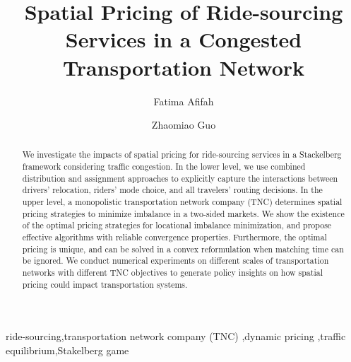 \documentclass[review]{elsarticle}
\begin{document}
\begin{frontmatter}

\title{Spatial Pricing of Ride-sourcing Services in a Congested Transportation Network}



\author[mymainaddress]{Fatima Afifah}
\author[mymainaddress]{Zhaomiao Guo}

\address[mymainaddress]{Department of Civil, Environmental and Construction Engineering\\
Resilient, Intelligent and Sustainable Energy Systems Cluster\\ 
	University of Central Florida, FL 32766
}

\begin{abstract}
	 We investigate the impacts of spatial pricing for ride-sourcing services in a Stackelberg framework considering traffic congestion. In the lower level, we use combined distribution and assignment approaches to explicitly capture the interactions between drivers' relocation, riders' mode choice, and all travelers' routing decisions. In the upper level, a monopolistic transportation network company (TNC) determines spatial pricing strategies to minimize imbalance in a two-sided markets. We show the existence of the optimal pricing strategies for locational imbalance minimization, and propose effective algorithms with reliable convergence properties. Furthermore, the optimal pricing is unique, and can be solved in a convex reformulation when matching time can be ignored. We conduct numerical experiments on different scales of transportation networks with different TNC objectives to generate policy insights on how spatial pricing could impact transportation systems. 
\end{abstract}

\begin{keyword}
ride-sourcing\sep transportation network company (TNC) \sep dynamic pricing \sep traffic equilibrium\sep Stakelberg game
\end{keyword}
\end{frontmatter}
\end{document}
